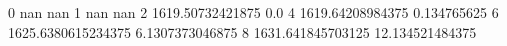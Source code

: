 0 nan nan
1 nan nan
2 1619.50732421875 0.0
4 1619.64208984375 0.134765625
6 1625.6380615234375 6.1307373046875
8 1631.641845703125 12.134521484375

